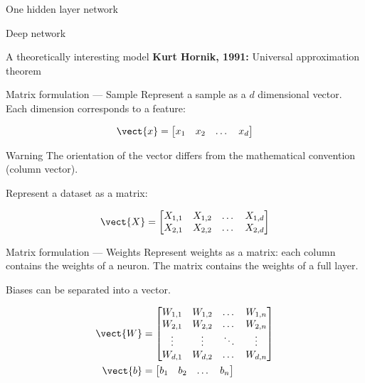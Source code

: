\begin{frame}{One hidden layer network}
  \centering
\end{frame}

\begin{frame}{Deep network}
  \centering
\end{frame}

\begin{frame}{A theoretically interesting model}
  \textbf{Kurt Hornik, 1991:} Universal approximation theorem

\end{frame}

\begin{frame}{Matrix formulation --- Sample}
  Represent a sample as a $d$ dimensional vector. Each dimension corresponds to a feature:

  \[
    \vect{x} = \begin{bmatrix}
      x_1 & x_2 & \dots & x_d
    \end{bmatrix}
  \]

  \begin{alertblock}{Warning}
    The orientation of the  vector differs from the mathematical convention (column vector).
  \end{alertblock}

  Represent a dataset as a matrix:

  \[
    \vect{X} = \begin{bmatrix}
      X_{1,1} & X_{1,2} & \dots & X_{1,d} \\
      X_{2,1} & X_{2,2} & \dots & X_{2,d}
    \end{bmatrix}
  \]

\end{frame}

\begin{frame}{Matrix formulation --- Weights}
  Represent weights as a matrix: each column contains the weights of a neuron.
  The matrix contains the weights of a full layer.

  Biases can be separated into a vector.

  \begin{align*}
    \vect{W} & = \begin{bmatrix}
      W_{1,1} & W_{1,2} & \dots  & W_{1,n} \\
      W_{2,1} & W_{2,2} & \dots  & W_{2,n} \\
      \vdots & \vdots & \ddots & \vdots \\
      W_{d,1} & W_{d,2} & \dots  & W_{d,n}
    \end{bmatrix} \\
    \vect{b} & = \begin{bmatrix}
      b_1 & b_2 & \dots & b_n
    \end{bmatrix}
  \end{align*}
\end{frame}

